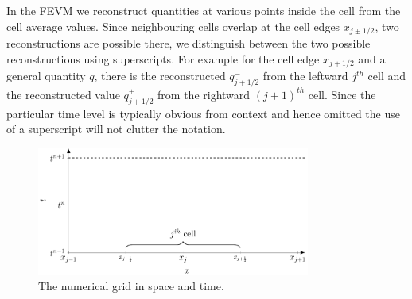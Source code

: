 In the FEVM we reconstruct quantities at various points inside the cell from the cell average values. Since neighbouring cells overlap at the cell edges $x_{j\pm1/2}$, two reconstructions are possible there, we distinguish between the two possible reconstructions using superscripts. For example for the cell edge $x_{j+1/2}$ and a general quantity $q$, there is the reconstructed $q^-_{j+1/2}$ from the leftward $j^{th}$ cell and the reconstructed value $q^+_{j+1/2}$ from the rightward $(j+1)^{th}$ cell. Since the particular time level is typically obvious from context and hence omitted the use of a superscript will not clutter the notation.

\begin{figure}
	\centering
	\includegraphics[width=0.8\textwidth]{./chp3/figures/Discretisation.pdf}
	\caption{The numerical grid in space and time.}
	\label{fig:NumericalGrid}
\end{figure}

